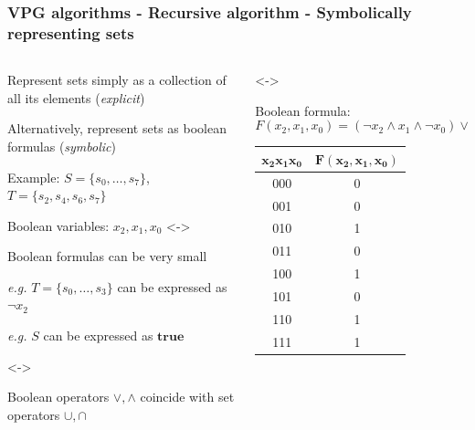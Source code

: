 \documentclass[aspectratio=169]{beamer}
\newcounter{picite}
\begin{document}
\begin{frame}[t]
\frametitle{VPG algorithms - Recursive algorithm - Symbolically representing sets}
\begin{columns}[T]
	\begin{column}{0.5\textwidth}
		\begin{itemize}
			\item Represent sets simply as a collection of all its elements (\textit{explicit})
			\item Alternatively, represent sets as boolean formulas (\textit{symbolic})\pause
			\item Example: $S = \{s_0,\dots,s_{7}\}$, $T = \{s_2,s_4,s_6,s_7\}$
			\item Boolean variables: $x_2,x_1,x_0$
			\setcounter{picite}{0}%
			\only<\thepicite->{%
			\item Boolean formulas can be very small
			\item \textit{e.g.} $T = \{s_0,\dots,s_3\}$ can be expressed as $\neg x_2$
			\item \textit{e.g.} $S$ can be expressed as $\textbf{true}$}
			\only<\thepicite->{%
			\item Boolean operators $\vee,\wedge$ coincide with set operators $\cup,\cap$}
		\end{itemize}
	\end{column}
	\begin{column}{0.5\textwidth}
		\setcounter{picite}{0}%
		\only<\thepicite->{%
		Boolean formula:
		\[F(x_2,x_1,x_0) = (\neg x_2 \wedge x_1 \wedge \neg x_0) \vee (x_2\wedge (x_1 \vee \neg x_0))\]
		\begin{tabular}{|c|c|}
			\hline 
			$\mathbf{x_2x_1x_0}$ & $\mathbf{F(x_2,x_1,x_0)}$ \\ 
			\hline 
			000 & 0 \\ 
			\hline 
			001 & 0 \\ 
			\hline 
			010 & 1 \\ 
			\hline 
			011 & 0 \\ 
			\hline 
			100 & 1 \\ 
			\hline 
			101 & 0 \\ 
			\hline 
			110 & 1 \\ 
			\hline 
			111 & 1 \\ 
			\hline
		\end{tabular}
	}\pause\pause\pause
	\end{column}
\end{columns}
\end{frame}
\end{document}
